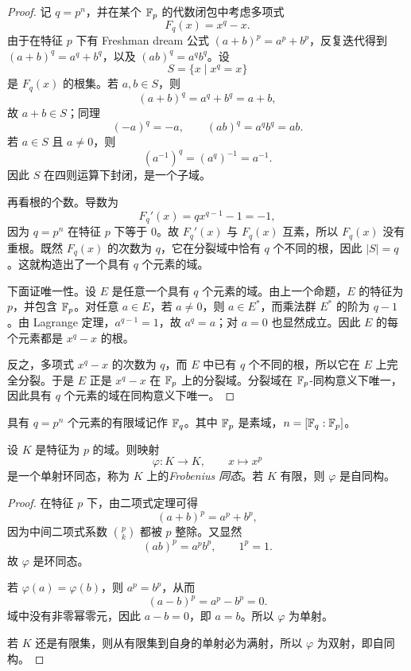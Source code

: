\begin{proof}
记 $q=p^n$，并在某个 $\mathbb{F}_p$ 的代数闭包中考虑多项式
\[
F_q(x)=x^q-x.
\]
由于在特征 $p$ 下有 Freshman dream 公式 $(a+b)^p=a^p+b^p$，反复迭代得到 $(a+b)^q=a^q+b^q$，以及 $(ab)^q=a^qb^q$。设
\[
S=\{x\mid x^q=x\}
\]
是 $F_q(x)$ 的根集。若 $a,b\in S$，则
\[
(a+b)^q=a^q+b^q=a+b,
\]
故 $a+b\in S$；同理
\[
(-a)^q=-a,\qquad (ab)^q=a^qb^q=ab.
\]
若 $a\in S$ 且 $a\ne0$，则
\[
(a^{-1})^q=(a^q)^{-1}=a^{-1}.
\]
因此 $S$ 在四则运算下封闭，是一个子域。

再看根的个数。导数为
\[
F_q'(x)=qx^{q-1}-1=-1,
\]
因为 $q=p^n$ 在特征 $p$ 下等于 $0$。故 $F_q'(x)$ 与 $F_q(x)$ 互素，所以 $F_q(x)$ 没有重根。既然 $F_q(x)$ 的次数为 $q$，它在分裂域中恰有 $q$ 个不同的根，因此 $|S|=q$。这就构造出了一个具有 $q$ 个元素的域。

下面证唯一性。设 $E$ 是任意一个具有 $q$ 个元素的域。由上一个命题，$E$ 的特征为 $p$，并包含 $\mathbb{F}_p$。对任意 $a\in E$，若 $a\ne0$，则 $a\in E^*$，而乘法群 $E^*$ 的阶为 $q-1$。由 Lagrange 定理，$a^{q-1}=1$，故 $a^q=a$；对 $a=0$ 也显然成立。因此 $E$ 的每个元素都是 $x^q-x$ 的根。

反之，多项式 $x^q-x$ 的次数为 $q$，而 $E$ 中已有 $q$ 个不同的根，所以它在 $E$ 上完全分裂。于是 $E$ 正是 $x^q-x$ 在 $\mathbb{F}_p$ 上的分裂域。分裂域在 $\mathbb{F}_p$-同构意义下唯一，因此具有 $q$ 个元素的域在同构意义下唯一。
\end{proof}

\begin{definition}
具有 $q=p^n$ 个元素的有限域记作 $\mathbb{F}_q$。其中 $\mathbb{F}_p$ 是素域，$n=[\mathbb{F}_q:\mathbb{F}_p]$。
\end{definition}

\begin{proposition}
设 $K$ 是特征为 $p$ 的域。则映射
\[
\varphi:K\longrightarrow K,\qquad x\longmapsto x^p
\]
是一个单射环同态，称为 $K$ 上的\emph{Frobenius 同态}。若 $K$ 有限，则 $\varphi$ 是自同构。
\end{proposition}

\begin{proof}
在特征 $p$ 下，由二项式定理可得
\[
(a+b)^p=a^p+b^p,
\]
因为中间二项式系数 $\binom{p}{k}$ 都被 $p$ 整除。又显然
\[
(ab)^p=a^pb^p,
\qquad 1^p=1.
\]
故 $\varphi$ 是环同态。

若 $\varphi(a)=\varphi(b)$，则 $a^p=b^p$，从而
\[
(a-b)^p=a^p-b^p=0.
\]
域中没有非零幂零元，因此 $a-b=0$，即 $a=b$。所以 $\varphi$ 为单射。

若 $K$ 还是有限集，则从有限集到自身的单射必为满射，所以 $\varphi$ 为双射，即自同构。
\end{proof}

